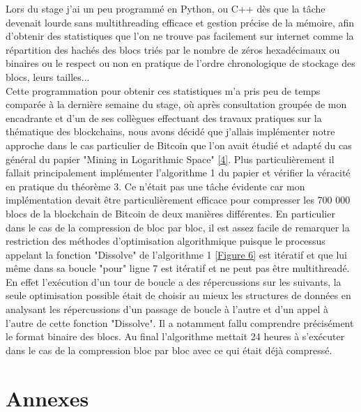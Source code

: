 \documentclass[12pt,a4paper]{article}
\newcommand{\source}[1]{\hyperlink{#1}{[#1]}}
\newcommand{\annexe}[2]{\hyperlink{#1}{[Figure #2]}}
\begin{document}
	Lors du stage j'ai un peu programmé en Python, ou C++ dès que la tâche devenait lourde sans multithreading efficace et gestion précise de la mémoire, afin d'obtenir des statistiques que l'on ne trouve pas facilement sur internet comme la répartition des hachés des blocs triés par le nombre de zéros hexadécimaux ou binaires ou le respect ou non en pratique de l'ordre chronologique de stockage des blocs, leurs tailles...\\ %
	Cette programmation pour obtenir ces statistiques m'a pris peu de temps comparée à la dernière semaine du stage, où après consultation groupée de mon encadrante et d'un de ses collègues effectuant des travaux pratiques sur la thématique des blockchains, nous avons décidé que j'allais implémenter notre approche dans le cas particulier de Bitcoin que l'on avait étudié et adapté du cas général du papier "Mining in Logarithmic Space" \source{4}. Plus particulièrement il fallait principalement implémenter l'algorithme 1 du papier et vérifier la véracité en pratique du théorème 3. Ce n'était pas une tâche évidente car mon implémentation devait être particulièrement efficace pour compresser les 700 000 blocs de la blockchain de Bitcoin de deux manières différentes. En particulier dans le cas de la compression de bloc par bloc, il est assez facile de remarquer la restriction des méthodes d'optimisation algorithmique puisque le processus appelant la fonction "Dissolve" de l'algorithme 1 \annexe{26}{6} est itératif et que lui même dans sa boucle "pour" ligne 7 est itératif et ne peut pas être multithreadé. En effet l'exécution d'un tour de boucle a des répercussions sur les suivants, la seule optimisation possible était de choisir au mieux les structures de données en analysant les répercussions d'un passage de boucle à l'autre et d'un appel à l'autre de cette fonction "Dissolve". Il a notamment fallu comprendre précisément le format binaire des blocs. Au final l'algorithme mettait 24 heures à s'exécuter dans le cas de la compression bloc par bloc avec ce qui était déjà compressé. %
	
	\newpage
	
	\section{Annexes}
	
\end{document}

